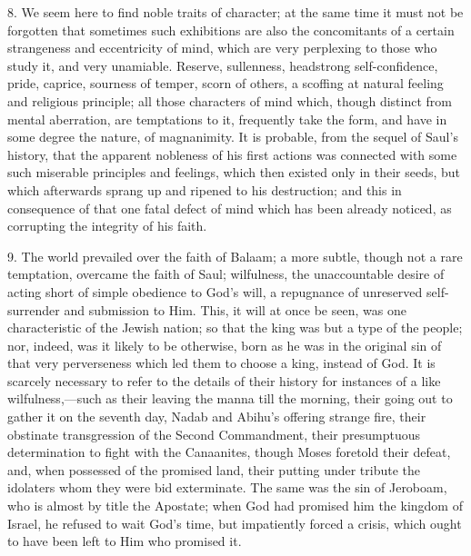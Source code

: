 8. We seem here to find noble traits of character; at the same time
it must not be forgotten that sometimes such exhibitions are also the
concomitants of a certain strangeness and eccentricity of mind, which
are very perplexing to those who study it, and very unamiable.
Reserve, sullenness, headstrong self-confidence, pride, caprice,
sourness of temper, scorn of others, a scoffing at natural feeling and
religious principle; all those characters of mind which, though
distinct from mental aberration, are temptations to it, frequently
take the form, and have in some degree the nature, of magnanimity. It
is probable, from the sequel of Saul's history, that the apparent
nobleness of his first actions was connected with some such miserable
principles and feelings, which then existed only in their seeds, but
which afterwards sprang up and ripened to his destruction; and this in
consequence of that one fatal defect of mind which has been already
noticed, as corrupting the integrity of his faith.

9. The world prevailed over the faith of Balaam; a more subtle,
though not a rare temptation, overcame the faith of Saul; wilfulness,
the unaccountable desire of acting short of simple obedience to God's
will, a repugnance of unreserved self-surrender and submission to Him.
This, it will at once be seen, was one characteristic of the Jewish
nation; so that the king was but a type of the people; nor, indeed,
was it likely to be otherwise, born as he was in the original sin of
that very perverseness which led them to choose a king, instead of
God. It is scarcely necessary to refer to the details of their history
for instances of a like wilfulness,—such as their leaving the manna
till the morning, their going out to gather it on the seventh day,
Nadab and Abihu's offering strange fire, their obstinate transgression
of the Second Commandment, their presumptuous determination to fight
with the Canaanites, though Moses foretold their defeat, and, when
possessed of the promised land, their putting under tribute the
idolaters whom they were bid exterminate. The same was the sin of
Jeroboam, who is almost by title the Apostate; when God had promised
him the kingdom of Israel, he refused to wait God's time, but
impatiently forced a crisis, which ought to have been left to Him who
promised it.

